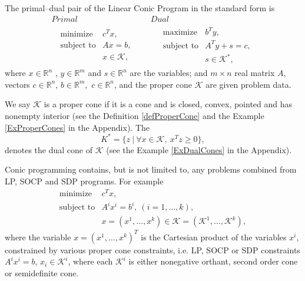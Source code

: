 \documentclass[12pt]{book}
\theoremstyle{definition}
\begin{document}
\label{defConeProg}
The primal--dual pair of the Linear Conic Program in the standard form is  
\begin{equation}
\label{coneProg} 
\begin{array}{cc}
Primal & Dual \\
\ \ \ \begin{array}{ll}
\mbox{minimize} & c^Tx,\\
\mbox{subject to}& Ax = b,\\
& x \in \mathcal{K},
\end{array} 
 \ \ \ \ \ & \ \ \ \ \ 
 \begin{array}{ll}
\mbox{maximize} & b^Ty,\\
\mbox{subject to}& A^Ty + s = c,\\
& s \in \mathcal{K}^*,
\end{array}
\end{array}
\tag{Conic Program}
\end{equation}
where $x\in \mathbb{R}^n$ , $y\in \mathbb{R}^m$ and $s\in \mathbb{R}^n$ are the variables; and $m\times n$ real matrix $A$, vectors $c\in \mathbb{R}^n$, $b\in \mathbb{R}^{m},$ $c\in \mathbb{R}^n$, and the proper cone $\mathcal{K}$ are given problem data. 

\rem
We say $\mathcal{K}$ is a proper cone if it is a cone and is closed, convex, pointed and has nonempty interior (see the Definition \ref{defProperCone} and the Example \ref{ExProperCones} in the Appendix). The 
\begin{equation*}
{K}^* = \{z\ |\ \forall x\in\mathcal{K}, \ x^Tz\geq 0\},
\end{equation*} 
denotes the dual cone of $\mathcal{K}$ (see the Example \ref{ExDualCones} in the Appendix).

Conic programming contains, but is not limited to, any problems combined from LP, SOCP and SDP programs. 
For example 
\begin{equation*}
\begin{array}{ll}
\mbox{minimize} & c^Tx,\\
\mbox{subject to}&A^ix^i=b^i, \ (i = 1,\dots ,k),\\
& x=(x^1,\dots ,x^k) \in \mathcal{K} = (\mathcal{K}^1,\dots ,\mathcal{K}^k),
\end{array} 
\end{equation*}
where the variable $x=(x^1, \dots, x^k)^T$ is the Cartesian product of the variables $x^i$, constrained by various proper cone constraints, i.e. LP, SOCP or SDP constraints 
$A^ix^i=b$, $x_i\in \mathcal{K}^i$, where each $\mathcal{K}^i$ is either nonegative orthant, second order cone or semidefinite cone.
\end{document}
